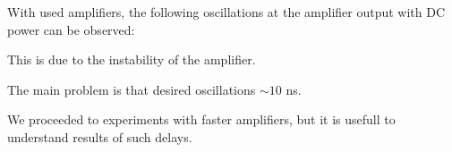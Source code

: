 With used amplifiers, the following oscillations at the amplifier output with DC power can be observed:

\begin{center}
\end{center}

This is due to the instability of the amplifier. 

\phantom{42}

The main problem is that desired oscillations $\sim 10$ ns. \\

\phantom{42}

We proceeded to experiments with faster amplifiers, but it is usefull to understand results of such delays.




